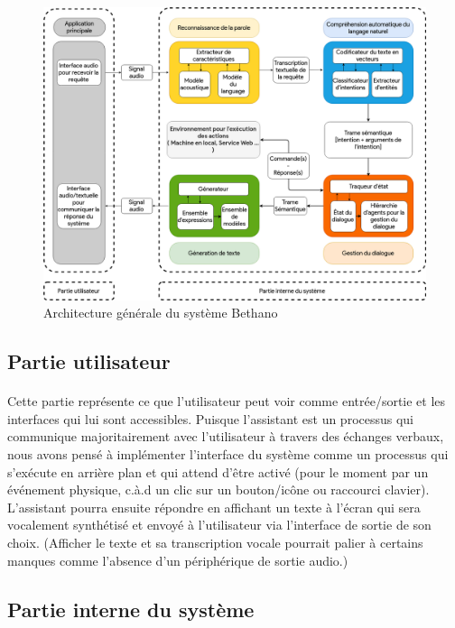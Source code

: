 \begin{figure}[H]
	\centering
	\includegraphics[width=\linewidth]{images/SPA_architecture.png}
	\caption{Architecture générale du système Bethano}
	\label{spaArch}
\end{figure}


	\subsection{Partie utilisateur}
	\paragraph{}
	Cette partie représente ce que l'utilisateur peut voir comme entrée/sortie et les interfaces qui lui sont accessibles. Puisque l'assistant est un processus qui communique majoritairement avec l'utilisateur à travers des échanges verbaux, nous avons pensé à implémenter l'interface du système comme un processus qui s'exécute en arrière plan et qui attend d'être activé (pour le moment par un événement physique, c.à.d un clic sur un bouton/icône ou raccourci clavier). L'assistant pourra ensuite répondre en affichant un texte à l'écran qui sera vocalement synthétisé et envoyé à l'utilisateur via l'interface de sortie de son choix. (Afficher le texte et sa transcription vocale pourrait palier à certains manques comme l'absence d'un périphérique de sortie audio.)
	\subsection{Partie interne du système}
	
